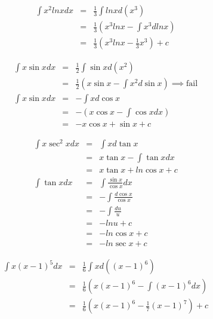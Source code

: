 \begin{eg}
$$\begin{array}{rcl}
\displaystyle \int x^2 ln x dx & = & \displaystyle \frac{1}{3} \int ln x d(x^3)\\
& = & \displaystyle \frac{1}{3} (x^3 ln x - \int x^3 d ln x)\\
& = & \displaystyle \frac{1}{3} (x^3 ln x - \frac{1}{3}x^3) + c
\end{array}$$
\end{eg}
\begin{eg}
$$\begin{array}{rcl}
\displaystyle \int x \sin x dx & = & \displaystyle \frac{1}{2} \int \sin x d(x^2)\\
& = & \displaystyle \frac{1}{2}(x \sin x - \int x^2 d\sin x) \implies \text{fail}\\
\displaystyle \int x \sin x dx & = & \displaystyle - \int x d\cos x\\
& = & \displaystyle -(x\cos x - \int \cos x dx)\\
& = & \displaystyle -x\cos x +\sin x + c
\end{array}$$
\end{eg}
\begin{eg}
$$\begin{array}{rcl}
\displaystyle \int x \sec^2x dx & = & \displaystyle \int x d\tan x\\
& = & \displaystyle x \tan x - \int \tan x dx\\
& = & \displaystyle x \tan x + ln \cos x +c\\
\displaystyle \int \tan x dx & = & \displaystyle \int \frac{\sin x}{\cos x}dx\\
& = & \displaystyle -\int \frac{d\cos x}{\cos x}\\
& = & \displaystyle -\int \frac{du}{u}\\
& = & \displaystyle -ln u + c\\
& = & \displaystyle -ln \cos x + c\\
& = & \displaystyle -ln \sec x + c
\end{array}$$
\end{eg}
\begin{eg}
$$\begin{array}{rcl}
\displaystyle \int x(x-1)^5 dx & = & \displaystyle \frac{1}{6} \int x d((x-1)^6)\\
& = & \displaystyle \frac{1}{6} (x(x-1)^6 - \int (x-1)^6 dx)\\
& = & \displaystyle \frac{1}{6} (x(x-1)^6 - \frac{1}{7} (x-1)^7) + c
\end{array}$$
\end{eg}
